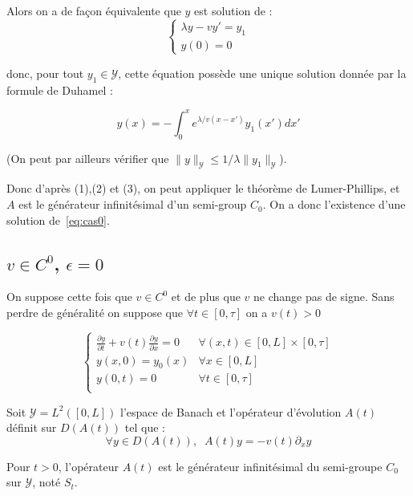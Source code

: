 \documentclass[a4paper]{article}
\begin{document}
\begin{preuve}
Alors on a de façon équivalente que $y$ est solution de :
\[ \begin{cases}
\lambda y - v y' = y_1 \\
y(0) = 0
\end{cases}\]

donc, pour tout $y_1 \in \mathscr{Y}$, cette équation possède une unique solution donnée par la formule de Duhamel :

\[ y(x) = - \int_0^x e^{\lambda/v (x-x')}y_1(x')dx' \]

(On peut par ailleurs vérifier que $ \| y \|_{\mathscr{Y}} \leq 1/ \lambda \|y_1 \|_{\mathscr{Y}}$).

Donc d'après (1),(2) et (3), on peut appliquer le théorème de Lumer-Phillips, et $A$ est le générateur infinitésimal d'un semi-group $C_0$.
On a donc l'existence d'une solution de~\eqref{eq:cas0}.
	
\end{preuve}


\subsection{$v \in C^0$, $\epsilon = 0$}


On suppose cette fois que $v \in C^0$ et de plus que $v$ ne change pas de signe. 
Sans perdre de généralité on suppose que $\forall t \in [0,\tau]$ on a $v(t)>0$

\begin{equation}
\label{eq:cas1}
\begin{cases}
 \displaystyle \frac{\partial y}{\partial t}
 + v(t) \frac{\partial y} {\partial x}  
 = 0  & \forall (x,t) \in [0,L] \times [0, \tau]\\
 y(x,0) = y_{0} (x) & \forall x \in [0,L] \\
 y(0,t) = 0 & \forall t \in [0,\tau] \\
\end{cases}
\end{equation}

Soit $\mathscr{Y} = L^2([0,L])$ l'espace de Banach et l'opérateur d'évolution $A(t)$ définit sur $D(A(t))$ tel que :
\[ \forall y \in D(A(t)), \; \; A(t)y = -v (t)\partial_x y \]

\begin{proposition}
	Pour $t>0$, l'opérateur $A(t)$ est le générateur infinitésimal du semi-groupe $C_0$ sur $\mathscr{Y}$,
	noté $S_t$.
\end{proposition}
\end{document}
